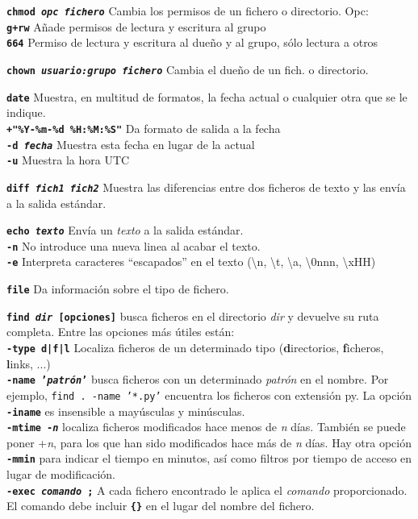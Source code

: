\documentclass[10pt,landscape,a4paper]{article}
\newcommand{\code}{\texttt}
\newcommand{\bcode}[1]{\texttt{\textbf{#1}}}
\begin{document}
\begin{multicols}{3}
\bcode{chmod \emph{opc} \emph{fichero}} Cambia los permisos de un fichero o directorio. Opc:\\
  \bcode{g+rw} Añade permisos de lectura y escritura al grupo\\
  \bcode{664} Permiso de lectura y escritura al dueño y al grupo, sólo lectura a otros

\bcode{chown \emph{usuario:grupo} \emph{fichero}} Cambia el dueño de un fich. o directorio.

\bcode{date} Muestra, en multitud de formatos, la fecha actual o cualquier otra que se le indique.\\
   \bcode{+"\%Y-\%m-\%d \%H:\%M:\%S"} Da formato de salida a la fecha\\
   \bcode{-d \emph{fecha}} Muestra esta fecha en lugar de la actual\\
   \bcode{-u} Muestra la hora UTC

\bcode{diff \emph{fich1} \emph{fich2}} Muestra las diferencias entre dos ficheros de texto y las envía a la salida estándar.

\bcode{echo \emph{texto}} Envía un \emph{texto} a la salida estándar.\\
  \bcode{-n} No introduce una nueva linea al acabar el texto.\\
  \bcode{-e} Interpreta caracteres ``escapados'' en el texto ({\textbackslash}n, {\textbackslash}t, {\textbackslash}a, {\textbackslash}0nnn, {\textbackslash}xHH)

\bcode{file} Da información sobre el tipo de fichero.

\bcode{find \emph{dir} [opciones]} busca ficheros en el directorio \emph{dir} y devuelve su ruta completa.
  Entre las opciones más útiles están:\\
  \bcode{-type d|f|l} Localiza ficheros de un determinado tipo (\textbf{d}irectorios, \textbf{f}icheros, \textbf{l}inks, ...)\\
  \bcode{-name '\emph{patrón}'} busca ficheros con un determinado \emph{patrón} en el nombre. Por ejemplo, \code{find . -name '*.py'} encuentra los ficheros con extensión py. La opción \bcode{-iname} es insensible a mayúsculas y minúsculas.\\
  \bcode{-mtime -\emph{n}} localiza ficheros modificados hace menos de \emph{n} días. También se puede poner +\emph{n}, para los que han sido modificados hace más de \emph{n} días. Hay otra opción \bcode{-mmin} para indicar el tiempo en minutos, así como filtros por tiempo de acceso en lugar de modificación.\\
  \bcode{-exec \emph{comando} ;} A cada fichero encontrado le aplica el \emph{comando} proporcionado. El comando debe incluir \bcode{\{\}} en el lugar del nombre del fichero.


\end{multicols}
\end{document}
